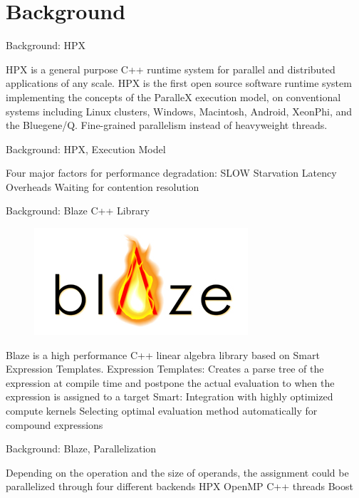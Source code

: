 \documentclass[10pt]{beamer}
\begin{document}
\section{Background}
\begin{frame}{Background: HPX}
	\begin{outline}
		\1HPX is a general purpose C++ runtime system for parallel and distributed applications of any scale.
		\1HPX is the first
		open source software runtime system implementing the concepts of
		the ParalleX execution model, on conventional systems
		including Linux clusters, Windows, Macintosh, Android, XeonPhi,
		and the Bluegene/Q.
		\1Fine-grained parallelism instead of heavyweight threads.
	\end{outline}
\end{frame}

\begin{frame}{Background: HPX, Execution Model}
	\begin{outline}
		Four major factors for performance degradation: SLOW
		\1Starvation
		\1Latency
		\1Overheads
		\1Waiting for contention resolution
	\end{outline}
\end{frame}


\begin{frame}{Background: Blaze C++ Library}
\begin{outline}
\begin{figure}[H]

	\includegraphics[width=0.22\linewidth]{images/blaze.png}
\end{figure}	
Blaze is a high performance C++ linear algebra library based on Smart Expression Templates.
 \1Expression Templates:
	\2Creates a parse tree of the expression at compile time and postpone the actual evaluation to when the expression is assigned to a target
\1Smart: 
	\2Integration with highly optimized compute kernels
	\2Selecting optimal evaluation method automatically for compound expressions
\end{outline}
\end{frame}


\begin{frame}{Background: Blaze, Parallelization}
	\begin{outline}
		Depending on the operation and the size of operands, the assignment could be parallelized through four different backends
		\1HPX 
		\1OpenMP
		\1C++ threads
		\1Boost
	\end{outline}
\end{frame}
\end{document}
